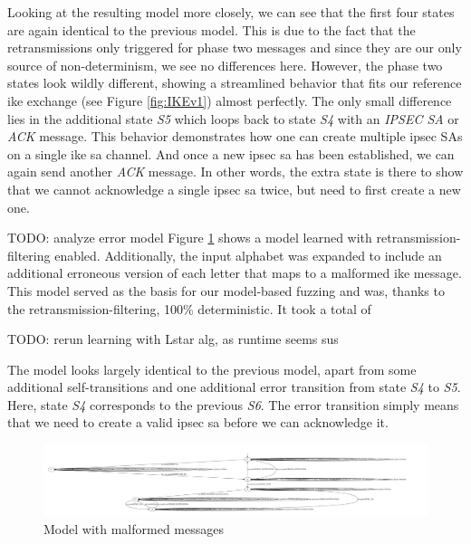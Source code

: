 Looking at the resulting model more closely, we can see that the first four states are again identical to the previous model. This is due to the fact that the retransmissions only triggered for phase two messages and since they are our only source of non-determinism, we see no differences here. However, the phase two states look wildly different, showing a streamlined behavior that fits our reference \ac{ike} exchange (see Figure \ref{fig:IKEv1}) almost perfectly. The only small difference lies in the additional state \emph{S5} which loops back to state \emph{S4} with an \emph{IPSEC SA} or \emph{ACK} message. This behavior demonstrates how one can create multiple \ac{ipsec} SAs on a single \ac{ike} \ac{sa} channel. And once a new \ac{ipsec} \ac{sa} has been established, we can again send another \emph{ACK} message. In other words, the extra state is there to show that we cannot acknowledge a single \ac{ipsec} \ac{sa} twice, but need to first create a new one.

TODO: analyze error model
Figure \ref{fig:withfilterwitherrors} shows a model learned with retransmission-filtering enabled. Additionally, the input alphabet was expanded to include an additional erroneous version of each letter that maps to a malformed \ac{ike} message. This model served as the basis for our model-based fuzzing and was, thanks to the retransmission-filtering, 100\% deterministic. It took a total of 

TODO: rerun learning with Lstar alg, as runtime seems sus

The model looks largely identical to the previous model, apart from some additional self-transitions and one additional error transition from state \emph{S4} to \emph{S5}. Here, state \emph{S4} corresponds to the previous \emph{S6}. The error transition simply means that we need to create a valid \ac{ipsec} \ac{sa} before we can acknowledge it.

\begin{figure}
	\centering
	\includegraphics[width=\linewidth]{images/models/WithFilterWithErrors_kv}
	\caption{Model with malformed messages}
	\label{fig:withfilterwitherrors}
\end{figure}

